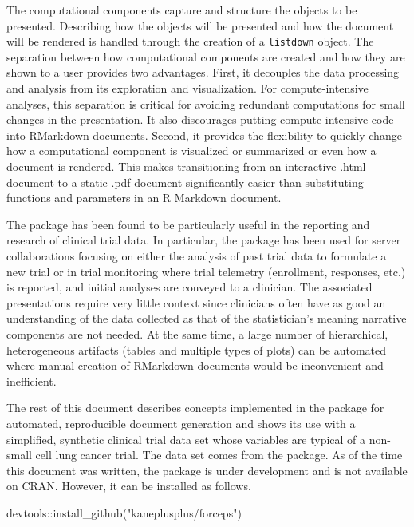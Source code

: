 The computational components capture and structure the objects to be
presented. Describing how the objects will be presented and how the
document will be rendered is handled through the creation of a
\texttt{listdown} object. The separation between how computational
components are created and how they are shown to a user provides two
advantages. First, it decouples the data processing and analysis from
its exploration and visualization. For compute-intensive analyses, this
separation is critical for avoiding redundant computations for small
changes in the presentation. It also discourages putting
compute-intensive code into RMarkdown documents. Second, it provides the
flexibility to quickly change how a computational component is
visualized or summarized or even how a document is rendered. This makes
transitioning from an interactive .html document to a static .pdf
document significantly easier than substituting functions and parameters
in an R Markdown document.

The package has been found to be particularly useful in the reporting
and research of clinical trial data. In particular, the package has been
used for server collaborations focusing on either the analysis of past
trial data to formulate a new trial or in trial monitoring where trial
telemetry (enrollment, responses, etc.) is reported, and initial
analyses are conveyed to a clinician. The associated presentations
require very little context since clinicians often have as good an
understanding of the data collected as that of the statistician's
meaning narrative components are not needed. At the same time, a large
number of hierarchical, heterogeneous artifacts (tables and multiple
types of plots) can be automated where manual creation of RMarkdown
documents would be inconvenient and inefficient.

The rest of this document describes concepts implemented in the
 package for automated, reproducible document generation
and shows its use with a simplified, synthetic clinical trial data set
whose variables are typical of a non-small cell lung cancer trial. The
data set comes from the  \citep{forceps} package. As of the
time this document was written, the package is under development and is
not available on CRAN. However, it can be installed as follows.

\begin{Schunk}
\begin{Sinput}
devtools::install_github("kaneplusplus/forceps")
\end{Sinput}
\end{Schunk}

